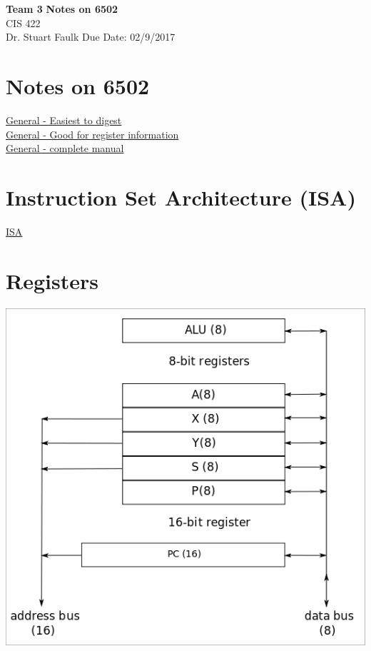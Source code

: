 \documentclass[a4paper, 11pt]{article}
\begin{document}
\noindent
\large\textbf{Team 3} \hfill \textbf{Notes on 6502} \\
\normalsize CIS 422 \hfill  \\
Dr. Stuart Faulk \hfill Due Date: 02/9/2017

\section*{Notes on 6502}
\href{http://apprize.info/programming/65816/5.html}{General - Easiest to digest}\\
\href{http://nesdev.com/6502.txt}{General - Good for register information}\\
\href{http://archive.6502.org/datasheets/synertek_programming_manual.pdf}{General - complete manual} 
\section{Instruction Set Architecture (ISA)}
\href{http://www.llx.com/~nparker/a2/opcodes.html#chart}{ISA} 

\section{Registers}
\includegraphics[scale=.75]{registers}
\end{document}
